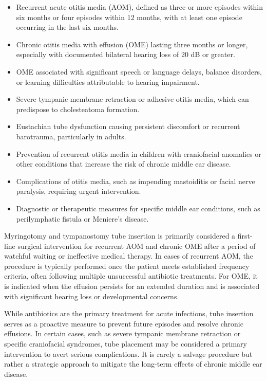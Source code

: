\begin{itemize}
  \item Recurrent acute otitis media (AOM), defined as three or more episodes within six months or four episodes within 12 months, with at least one episode occurring in the last six months.
  \item Chronic otitis media with effusion (OME) lasting three months or longer, especially with documented bilateral hearing loss of 20 dB or greater.
  \item OME associated with significant speech or language delays, balance disorders, or learning difficulties attributable to hearing impairment.
  \item Severe tympanic membrane retraction or adhesive otitis media, which can predispose to cholesteatoma formation.
  \item Eustachian tube dysfunction causing persistent discomfort or recurrent barotrauma, particularly in adults.
  \item Prevention of recurrent otitis media in children with craniofacial anomalies or other conditions that increase the risk of chronic middle ear disease.
  \item Complications of otitis media, such as impending mastoiditis or facial nerve paralysis, requiring urgent intervention.
  \item Diagnostic or therapeutic measures for specific middle ear conditions, such as perilymphatic fistula or Meniere's disease.
\end{itemize}

Myringotomy and tympanostomy tube insertion is primarily considered a first-line surgical intervention for recurrent AOM and chronic OME after a period of watchful waiting or ineffective medical therapy. In cases of recurrent AOM, the procedure is typically performed once the patient meets established frequency criteria, often following multiple unsuccessful antibiotic treatments. For OME, it is indicated when the effusion persists for an extended duration and is associated with significant hearing loss or developmental concerns.

While antibiotics are the primary treatment for acute infections, tube insertion serves as a proactive measure to prevent future episodes and resolve chronic effusions. In certain cases, such as severe tympanic membrane retraction or specific craniofacial syndromes, tube placement may be considered a primary intervention to avert serious complications. It is rarely a salvage procedure but rather a strategic approach to mitigate the long-term effects of chronic middle ear disease.

